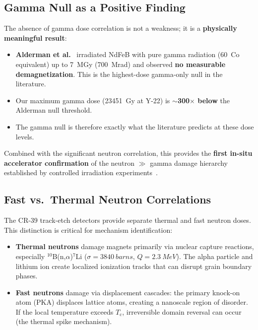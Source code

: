 \documentclass[11pt,letterpaper]{article}
\newcommand{\Tc}{T_\mathrm{c}}
\begin{document}
\subsection{Gamma Null as a Positive Finding}
\label{sec:gamma_null}

The absence of gamma dose correlation is not a weakness; it is a
\textbf{physically meaningful result}:

\begin{itemize}
    \item \textbf{Alderman et al.}~\cite{Alderman} irradiated NdFeB with pure
    gamma radiation (\SI{60}{Co} equivalent) up to \SI{7}{MGy} (700~Mrad) and
    observed \textbf{no measurable demagnetization}. This is the highest-dose
    gamma-only null in the literature.
    \item Our maximum gamma dose (\SI{23451}{Gy} at Y-22) is
    \textbf{$\sim$300$\times$ below} the Alderman null threshold.
    \item The gamma null is therefore exactly what the literature predicts at
    these dose levels.
\end{itemize}

Combined with the significant neutron correlation, this provides the
\textbf{first in-situ accelerator confirmation} of the neutron $\gg$ gamma
damage hierarchy established by controlled irradiation
experiments~\cite{Shen2018,Alderman,APSLS290}.

\subsection{Fast vs.\ Thermal Neutron Correlations}
\label{sec:fast_thermal}

The CR-39 track-etch detectors provide separate thermal and fast neutron
doses. This distinction is critical for mechanism identification:
\begin{itemize}
    \item \textbf{Thermal neutrons} damage magnets primarily via nuclear
    capture reactions, especially ${}^{10}$B(n,$\alpha$)${}^{7}$Li ($\sigma =
    \SI{3840}{barns}$, $Q = \SI{2.3}{MeV}$). The alpha particle and lithium
    ion create localized ionization tracks that can disrupt grain boundary
    phases.
    \item \textbf{Fast neutrons} damage via displacement cascades: the primary
    knock-on atom (PKA) displaces lattice atoms, creating a nanoscale region
    of disorder. If the local temperature exceeds $\Tc$, irreversible domain
    reversal can occur (the thermal spike mechanism).
\end{itemize}
\end{document}
